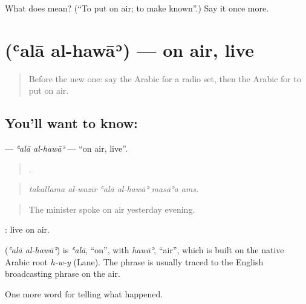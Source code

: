 \begin{tcolorbox}[breakable,colback=teal!4,colframe=teal!35!black,title={Before you move on}]
What does  mean? (\textquotedblleft{}To put on air; to make known\textquotedblright{}.) Say it once more.
\end{tcolorbox}
\section[\texorpdfstring{\ar{على} \ar{الهواء} (ʿalā al-hawāʾ)}{على الهواء (ʿalā al-hawāʾ)}]{  (ʿalā al-hawāʾ) — on air, live}

\label{lesson:AR-C297-ala-al-hawa}



\begin{quote}
Before the new one: say the Arabic for a radio set, then the Arabic for to put on air.
\end{quote}

\subsection*{You'll want to know:  }
\textbf{ } — \emph{ʿalā al-hawāʾ} — \textquotedblleft{}on air, live\textquotedblright{}.

\begin{quote}
     .
\end{quote}

\begin{quote}
\emph{takallama al-wazīr ʿalā al-hawāʾ masāʾa ams.}
\end{quote}

\begin{quote}
The minister spoke on air yesterday evening.
\end{quote}

  : live on air.

\begin{cousinweb}
\textbf{ } (\emph{ʿalā al-hawāʾ}) is \emph{ʿalā}, \textquotedblleft{}on\textquotedblright{}, with \emph{hawāʾ}, \textquotedblleft{}air\textquotedblright{}, which is built on the native Arabic root \emph{h-w-y} (Lane). The phrase is usually traced to the English broadcasting phrase on the air.
\end{cousinweb}

\begin{grammarlens}[title={What you've built}]
One more word for telling what happened.
\end{grammarlens}

